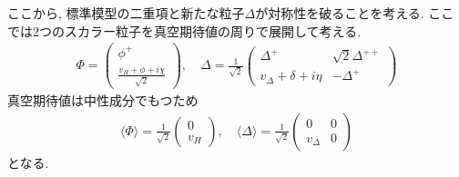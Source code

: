 ここから, 標準模型の二重項と新たな粒子$\Delta$が対称性を破ることを考える.
ここでは2つのスカラー粒子を真空期待値の周りで展開して考える.
\begin{align}
  \Phi = \begin{pmatrix}
    \phi^+ \\
    \frac{v_H + \phi  +i\chi}{\sqrt{2}}
  \end{pmatrix},\quad
  \Delta =\frac{1}{\sqrt{2}}\begin{pmatrix}
    \Delta^+ & \sqrt{2}\Delta^{++} \\
    v_\Delta + \delta + i\eta & -\Delta^+
  \end{pmatrix} \label{vev_newh}
\end{align}
真空期待値は中性成分でもつため
\begin{align}
  \langle \Phi \rangle = \frac{1}{\sqrt{2}}\begin{pmatrix}
    0 \\
    v_H
    \end{pmatrix},\quad \langle \Delta \rangle = \frac{1}{\sqrt{2}}\begin{pmatrix}
    0 & 0 \\
    v_\Delta & 0 
  \end{pmatrix}
\end{align}
となる.


